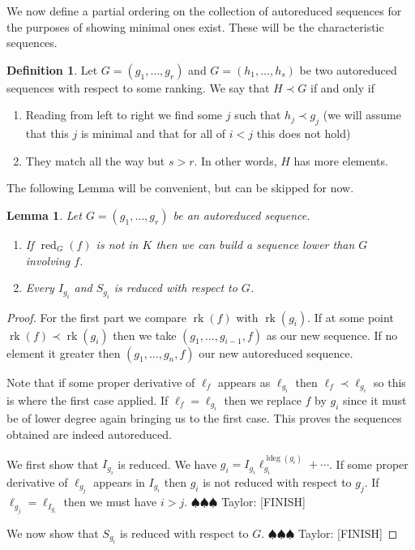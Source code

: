\documentclass[12pt]{book}
\newcommand{\taylor}[1]{{\color{blue} \sf $\spadesuit\spadesuit\spadesuit$ Taylor: [#1]}}
\numberwithin{equation}{section}
\newtheorem{lemma}[theorem]{Lemma}
\theoremstyle{definition}
\newtheorem{definition}[theorem]{Definition}
\theoremstyle{remark}
\newcommand{\ldeg}{\operatorname{ldeg}}
\newcommand{\red}{\operatorname{red}}
\newcommand{\rk}{\operatorname{rk}}
\begin{document}
We now define a partial ordering on the collection of autoreduced sequences for the purposes of showing minimal ones exist. 
These will be the characteristic sequences.

\begin{definition}
Let $G = (g_1,\ldots,g_r)$ and $G=(h_1,\ldots,h_s)$ be two autoreduced sequences with respect to some ranking. 
We say that $H\prec G$ if and only if	
\begin{enumerate}[topsep=0pt]
	\item Reading from left to right we find some $j$ such that $h_j \prec g_j$ (we will assume that this $j$ is minimal and that for all of $i<j$ this does not hold)
	\item They match all the way but $s>r$. In other words, $H$ has more elements.
\end{enumerate}
\end{definition}

The following Lemma will be convenient, but can be skipped for now. 
\begin{lemma}\label{L:sequence-lemmas}
	Let $G=(g_1,\ldots,g_r)$ be an autoreduced sequence.
	\begin{enumerate}[topsep=0pt]
		\item \label{I:reduced-gives-lower} If $\red_G(f)$ is not in $K$ then we can build a sequence lower than $G$ involving $f$. 
		\item \label{I:initials-and-separants} Every $I_{g_i}$ and $S_{g_i}$ is reduced with respect to $G$. 
	\end{enumerate}
\end{lemma}
\begin{proof}
For the first part we compare $\rk(f)$ with $\rk(g_i)$. 
If at some point $\rk(f)\prec \rk(g_i)$ then we take $(g_1,\ldots,g_{i-1},f)$ as our new sequence. 
If no element it greater then $(g_1,\ldots,g_n,f)$ our new autoreduced sequence. 

Note that if some proper derivative of $\ell_f$ appears as $\ell_{g_i}$ then $\ell_f \prec \ell_{g_i}$ so this is where the first case applied. 
If $\ell_f = \ell_{g_i}$ then we replace $f$ by $g_i$ since it must be of lower degree again bringing us to the first case.
This proves the sequences obtained are indeed autoreduced. 

We first show that $I_{g_i}$ is reduced. 
We have $g_i = I_{g_i} \ell_{g_i}^{\ldeg(g_i)} + \cdots$.
If some proper derivative of $\ell_{g_j}$ appears in $I_{g_i}$ then $g_i$ is not reduced with respect to $g_j$.
If $\ell_{g_j}= \ell_{I_{g_i}}$ then we must have $i>j$.
\taylor{FINISH}

We now show that $S_{g_i}$ is reduced with respect to $G$.
\taylor{FINISH}


\end{proof}
\end{document}
